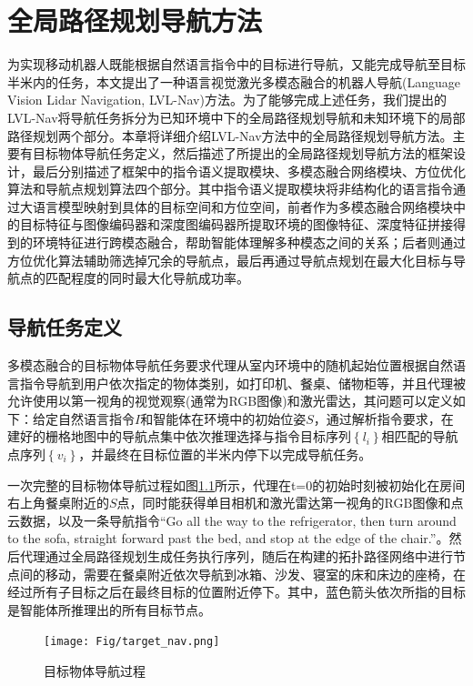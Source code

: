 
\chapter{全局路径规划导航方法}
为实现移动机器人既能根据自然语言指令中的目标进行导航，又能完成导航至目标半米内的任务，本文提出了一种语言视觉激光多模态融合的机器人导航(Language Vision Lidar Navigation, LVL-Nav)方法。为了能够完成上述任务，我们提出的LVL-Nav将导航任务拆分为已知环境中下的全局路径规划导航和未知环境下的局部路径规划两个部分。本章将详细介绍LVL-Nav方法中的全局路径规划导航方法。主要有目标物体导航任务定义，然后描述了所提出的全局路径规划导航方法的框架设计，最后分别描述了框架中的指令语义提取模块、多模态融合网络模块、方位优化算法和导航点规划算法四个部分。其中指令语义提取模块将非结构化的语言指令通过大语言模型映射到具体的目标空间和方位空间，前者作为多模态融合网络模块中的目标特征与图像编码器和深度图编码器所提取环境的图像特征、深度特征拼接得到的环境特征进行跨模态融合，帮助智能体理解多种模态之间的关系；后者则通过方位优化算法辅助筛选掉冗余的导航点，最后再通过导航点规划在最大化目标与导航点的匹配程度的同时最大化导航成功率。

\section{导航任务定义}
多模态融合的目标物体导航任务要求代理从室内环境中的随机起始位置根据自然语言指令导航到用户依次指定的物体类别，如打印机、餐桌、储物柜等，并且代理被允许使用以第一视角的视觉观察(通常为RGB图像)和激光雷达，其问题可以定义如下：给定自然语言指令$I$和智能体在环境中的初始位姿$S$，通过解析指令要求，在建好的栅格地图中的导航点集中依次推理选择与指令目标序列$\left\{ {{l_i}} \right\}$相匹配的导航点序列$\left\{ {{v_i}} \right\}$，并最终在目标位置的半米内停下以完成导航任务。

一次完整的目标物体导航过程如图\ref{simularity_world}所示，代理在t=0的初始时刻被初始化在房间右上角餐桌附近的$S$点，同时能获得单目相机和激光雷达第一视角的RGB图像和点云数据，以及一条导航指令“Go all the way to the refrigerator, then turn around to the sofa, straight forward past the bed, and stop at the edge of the chair.”。然后代理通过全局路径规划生成任务执行序列，随后在构建的拓扑路径网络中进行节点间的移动，需要在餐桌附近依次导航到冰箱、沙发、寝室的床和床边的座椅，在经过所有子目标之后在最终目标的位置附近停下。其中，蓝色箭头依次所指的目标是智能体所推理出的所有目标节点。
\begin{figure}[htbp]
    \centering
    \texttt{[image: Fig/target\_nav.png]}
    \caption{\label{simularity_world}目标物体导航过程}
\end{figure}



